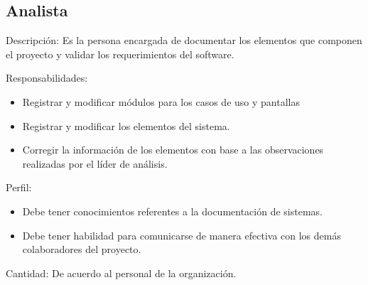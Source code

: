 \begin{Usuario}{\hypertarget{analista}{\subsection{Analista}}}{
}
	\item[Descripción:]
	Es la persona encargada de documentar los elementos que componen el proyecto y validar los requerimientos del software.
    \item[Responsabilidades:] \cdtEmpty
    \begin{itemize}
		\item Registrar y modificar módulos para los casos de uso y pantallas 
		\item Registrar y modificar los elementos del sistema.
		\item Corregir la información de los elementos con base a las observaciones realizadas por el líder de análisis.
    \end{itemize}

	\item[Perfil:] \cdtEmpty
    \begin{itemize}
		\item Debe tener conocimientos referentes a la documentación de sistemas.
		\item Debe tener habilidad para comunicarse de manera efectiva con los demás colaboradores del proyecto.
    \end{itemize}
    \item[Cantidad: ]
    De acuerdo al personal de la organización.
\end{Usuario}